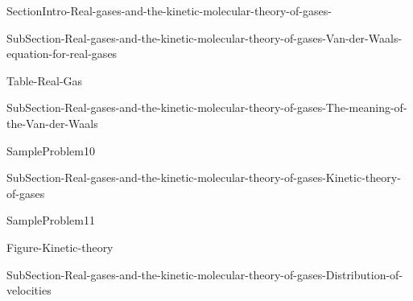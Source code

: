 \documentclass[main.tex]{subfiles}
\begin{document}
 {SectionIntro-Real-gases-and-the-kinetic-molecular-theory-of-gases-}
 
\sloppy 
\begin{description}
 {SubSection-Real-gases-and-the-kinetic-molecular-theory-of-gases-Van-der-Waals-equation-for-real-gases}



{Table-Real-Gas}		



 {SubSection-Real-gases-and-the-kinetic-molecular-theory-of-gases-The-meaning-of-the-Van-der-Waals}
		




{SampleProblem10}


 {SubSection-Real-gases-and-the-kinetic-molecular-theory-of-gases-Kinetic-theory-of-gases}

{SampleProblem11}




 {Figure-Kinetic-theory}
 

 {SubSection-Real-gases-and-the-kinetic-molecular-theory-of-gases-Distribution-of-velocities}



\end{description}

\clearpage\thispagestyle{empty}\mbox{}\clearpage
\end{document}
